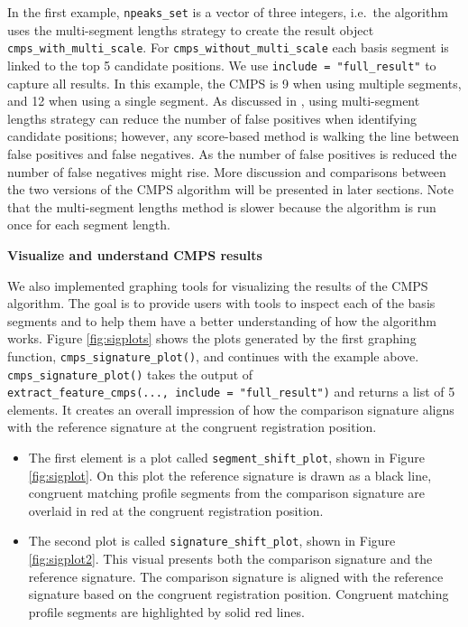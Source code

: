 In the first example, \texttt{npeaks\_set} is a vector of three
integers, i.e.~the algorithm uses the multi-segment lengths strategy to
create the result object \texttt{cmps\_with\_multi\_scale}. For
\texttt{cmps\_without\_multi\_scale} each basis segment is linked to the
top 5 candidate positions. We use \texttt{include\ =\ "full\_result"} to
capture all results. In this example, the CMPS is 9 when using multiple
segments, and 12 when using a single segment. As discussed in
\citet{cmps}, using multi-segment lengths strategy can reduce the number
of false positives when identifying candidate positions; however, any
score-based method is walking the line between false positives and false
negatives. As the number of false positives is reduced the number of
false negatives might rise. More discussion and comparisons between the
two versions of the CMPS algorithm will be presented in later sections.
Note that the multi-segment lengths method is slower because the
algorithm is run once for each segment length.

\textbf{Visualize and understand CMPS results}

We also implemented graphing tools for visualizing the results of the
CMPS algorithm. The goal is to provide users with tools to inspect each
of the basis segments and to help them have a better understanding of
how the algorithm works. Figure \ref{fig:sigplots} shows the plots
generated by the first graphing function,
\texttt{cmps\_signature\_plot()}, and continues with the example above.
\texttt{cmps\_signature\_plot()} takes the output of
\texttt{extract\_feature\_cmps(...,\ include\ =\ "full\_result")} and
returns a list of 5 elements. It creates an overall impression of how
the comparison signature aligns with the reference signature at the
congruent registration position.

\begin{itemize}
\item
  The first element is a plot called \texttt{segment\_shift\_plot},
  shown in Figure \ref{fig:sigplot}. On this plot the reference
  signature is drawn as a black line, congruent matching profile
  segments from the comparison signature are overlaid in red at the
  congruent registration position.
\item
  The second plot is called \texttt{signature\_shift\_plot}, shown in
  Figure \ref{fig:sigplot2}. This visual presents both the comparison
  signature and the reference signature. The comparison signature is
  aligned with the reference signature based on the congruent
  registration position. Congruent matching profile segments are
  highlighted by solid red lines.
\end{itemize}

